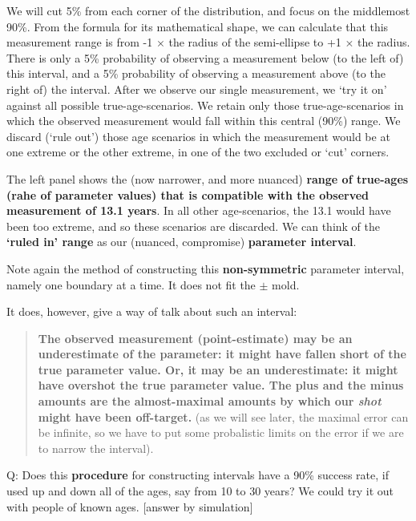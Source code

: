 \documentclass[]{book}
\begin{document}
We will cut 5\% from each corner of the distribution, and focus on the middlemost 90\%. From the formula for its mathematical shape, we can calculate that this measurement range is from
-1 \(\times\) the radius of the semi-ellipse to
+1 \(\times\) the radius. There is only a 5\% probability of observing a measurement below (to the left of) this interval, and a 5\% probability of observing a measurement above (to the right of) the interval. After we observe our single measurement, we `try it on' against all possible true-age-scenarios. We retain only those true-age-scenarios in which the observed measurement would fall within this central (90\%) range. We discard (`rule out') those age scenarios in which the measurement would be at one extreme or the other extreme, in one of the two excluded or `cut' corners.

The left panel shows the (now narrower, and more nuanced) \textbf{range of true-ages (rahe of parameter values) that is compatible with the observed measurement of 13.1 years}. In all other age-scenarios, the 13.1 would have been too extreme, and so these scenarios are discarded. We can think of the \textbf{`ruled in' range} as our (nuanced, compromise) \textbf{parameter interval}.

Note again the method of constructing this \textbf{non-symmetric} parameter interval, namely one boundary at a time. It does not fit the \(\pm\) mold.

It does, however, give a way of talk about such an interval:

\begin{quote}
\textbf{The observed measurement (point-estimate) may be an underestimate of the parameter: it might have fallen short of the true parameter value. Or, it may be an underestimate: it might have overshot the true parameter value. The plus and the minus amounts are the almost-maximal amounts by which our \emph{shot} might have been off-target.} (as we will see later, the maximal error can be infinite, so we have to put some probalistic limits on the error if we are to narrow the interval).
\end{quote}

Q: Does this \textbf{procedure} for constructing intervals have a 90\% success rate, if used up and down all of the ages, say from 10 to 30 years? We could try it out with people of known ages. {[}answer by simulation{]}
\end{document}
